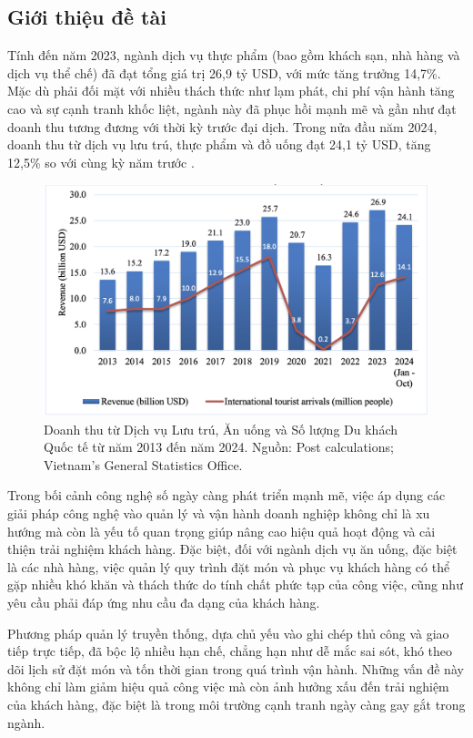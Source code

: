 \subsection{Giới thiệu đề tài}

Tính đến năm 2023, ngành dịch vụ thực phẩm (bao gồm khách sạn, nhà hàng và dịch vụ thể chế) đã đạt tổng giá trị 26,9 tỷ USD, với mức tăng trưởng 14,7\%. Mặc dù phải đối mặt với nhiều thách thức như lạm phát, chi phí vận hành tăng cao và sự cạnh tranh khốc liệt, ngành này đã phục hồi mạnh mẽ và gần như đạt doanh thu tương đương với thời kỳ trước đại dịch. Trong nửa đầu năm 2024, doanh thu từ dịch vụ lưu trú, thực phẩm và đồ uống đạt 24,1 tỷ USD, tăng 12,5\% so với cùng kỳ năm trước \cite{USDA}. 

\begin{figure}[H]
    \centering
    \includegraphics[width=15cm]{Images/resindus.png}
    \caption{Doanh thu từ Dịch vụ Lưu trú, Ăn uống và Số lượng Du khách Quốc tế từ năm 2013 đến năm 2024. Nguồn: Post calculations; Vietnam’s General Statistics Office.}
    \label{fig:enter-label}
\end{figure}

Trong bối cảnh công nghệ số ngày càng phát triển mạnh mẽ, việc áp dụng các giải pháp công nghệ vào quản lý và vận hành doanh nghiệp không chỉ là xu hướng mà còn là yếu tố quan trọng giúp nâng cao hiệu quả hoạt động và cải thiện trải nghiệm khách hàng. Đặc biệt, đối với ngành dịch vụ ăn uống, đặc biệt là các nhà hàng, việc quản lý quy trình đặt món và phục vụ khách hàng có thể gặp nhiều khó khăn và thách thức do tính chất phức tạp của công việc, cũng như yêu cầu phải đáp ứng nhu cầu đa dạng của khách hàng.

Phương pháp quản lý truyền thống, dựa chủ yếu vào ghi chép thủ công và giao tiếp trực tiếp, đã bộc lộ nhiều hạn chế, chẳng hạn như dễ mắc sai sót, khó theo dõi lịch sử đặt món và tốn thời gian trong quá trình vận hành. Những vấn đề này không chỉ làm giảm hiệu quả công việc mà còn ảnh hưởng xấu đến trải nghiệm của khách hàng, đặc biệt là trong môi trường cạnh tranh ngày càng gay gắt trong ngành.

